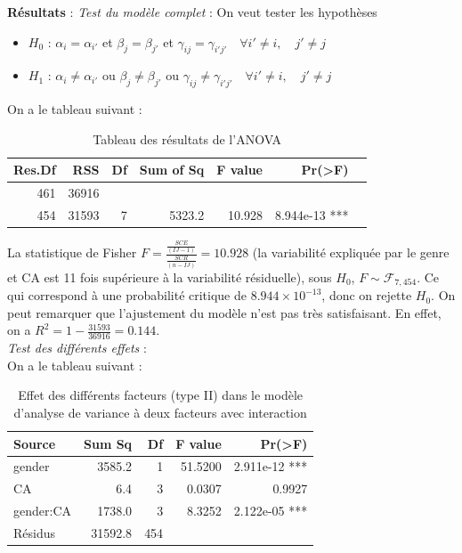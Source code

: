 \documentclass[12pt,a4paper]{article}
\begin{document}
	\textbf{Résultats} : 
	\textit{Test du modèle complet} : 
	On veut tester les hypothèses 
	\begin{itemize}
		\item \textbf{$H_0$} : $\alpha_i = \alpha_{i'}$ et $\beta_j = \beta_{j'}$ et $\gamma_{ij} = \gamma_{i'j'} \quad \forall i' \neq i,\quad j' \neq j$
		\item \textbf{$H_1$} : $\alpha_i \neq \alpha_{i'}$ ou $\beta_j \neq \beta_{j'}$ ou $\gamma_{ij} \neq \gamma_{i'j'} \quad \forall i' \neq i,\quad j' \neq j$
	\end{itemize}
	On a le tableau suivant : 
	\begin{table}[H]
		\centering
		\begin{tabular}{rrrrrrr}
			\toprule
			\textbf{Res.Df} & \textbf{RSS} & \textbf{Df} & \textbf{Sum of Sq} & \textbf{F value} & \textbf{Pr(>F)} \\ 
			\midrule
			461 & 36916 & & & & & \\ 
			454 & 31593 & 7 & 5323.2 & 10.928 & 8.944e-13 *** \\ 
			\bottomrule
		\end{tabular}
		\caption{Tableau des résultats de l'ANOVA}
		\label{tab:anova_results1}
	\end{table}
	La statistique de Fisher $F = \frac{\frac{SCE}{(IJ - 1)}}{\frac{SCR}{(n - IJ)}} = 10.928$ (la variabilité expliquée par le genre et CA est 11 fois supérieure à la variabilité résiduelle), sous $H_0$, $F \sim \mathcal{F}_{7,454}$. Ce qui correspond à une probabilité critique de $8.944 \times 10^{-13}$, donc on rejette $H_0$.
	On peut remarquer que l'ajustement du modèle n'est pas très satisfaisant. En effet, on a $R^2 = 1 - \frac{31593}{36916} = 0.144$.\\
	
	\textit{Test des différents effets} :\\
	On a le tableau suivant : 
	\begin{table}[H]
		\centering
		\begin{tabular}{lrrrr}
			\toprule
			Source & Sum Sq & Df & F value & Pr(>F) \\ 
			\midrule
			gender & 3585.2 & 1 & 51.5200 & 2.911e-12 *** \\ 
			CA & 6.4 & 3 & 0.0307 & 0.9927 \\ 
			gender:CA & 1738.0 & 3 & 8.3252 & 2.122e-05 *** \\ 
			Résidus & 31592.8 & 454 & & \\ 
			\bottomrule
		\end{tabular}
		\caption{Effet des différents facteurs (type II) dans le modèle d'analyse de variance à deux facteurs avec interaction}
		\label{tab:anova_results2}
	\end{table}
	
\end{document}
